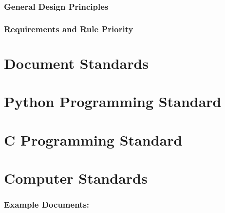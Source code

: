 \documentclass[11pt,a4paper]{article}
\begin{document}
\section{General Design Principles}


\section{Requirements and Rule Priority}


\pagebreak
\part{Document Standards}


\pagebreak
\part{Python Programming Standard}


\pagebreak
\part{C Programming Standard}


\pagebreak
\part{Computer Standards}


%
%
%
%

%
%
%

\pagebreak
\appendix

\section{Example Documents:}

\end{document}
